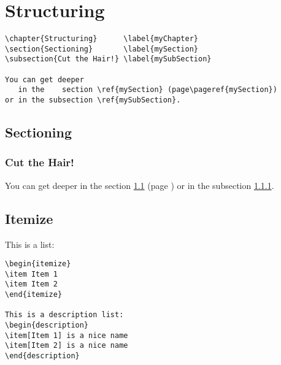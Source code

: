 \chapter{Structuring}\label{myChapter}

\begin{LaTeXsource}[Sectioning]
\begin{verbatim}
\chapter{Structuring}      \label{myChapter}
\section{Sectioning}       \label{mySection}
\subsection{Cut the Hair!} \label{mySubSection}

You can get deeper
   in the    section \ref{mySection} (page\pageref{mySection})
or in the subsection \ref{mySubSection}.
\end{verbatim}
\end{LaTeXsource}

\begin{Results}
\section{Sectioning}       \label{mySection}
\subsection{Cut the Hair!} \label{mySubSection}

You can get deeper
   in the    section \ref{mySection} (page \pageref{mySection})
or in the subsection \ref{mySubSection}.
\end{Results}

\pagebreak

\section{Itemize}

This is a list:
\begin{LaTeXsource}[Itemize]
\begin{verbatim}
\begin{itemize}
\item Item 1
\item Item 2
\end{itemize}

This is a description list:
\begin{description}
\item[Item 1] is a nice name
\item[Item 2] is a nice name
\end{description}
\end{verbatim}
\end{LaTeXsource}

